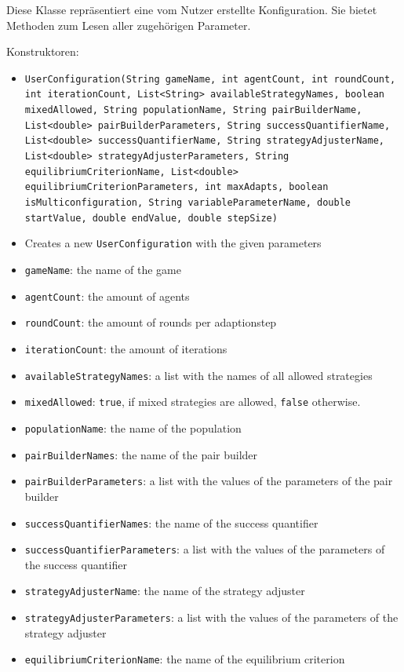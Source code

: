 \documentclass[parskip=full,11pt]{scrartcl}
\begin{document}
Diese Klasse repräsentiert eine vom Nutzer erstellte Konfiguration. Sie bietet Methoden zum Lesen aller zugehörigen Parameter.

Konstruktoren:
\begin{itemize}\itemsep -10pt
\item \texttt{UserConfiguration(String gameName, int agentCount, int roundCount, int iterationCount, List<String> availableStrategyNames, boolean mixedAllowed, String populationName, String pairBuilderName, List<double> pairBuilderParameters, String successQuantifierName, List<double> successQuantifierName, String strategyAdjusterName, List<double> strategyAdjusterParameters, String\\ equilibriumCriterionName, List<double> equilibriumCriterionParameters, int maxAdapts, boolean isMulticonfiguration, String variableParameterName, double startValue, double endValue, double stepSize)}
\item[] Creates a new \texttt{UserConfiguration} with the given parameters
\item[] \texttt{gameName}: the name of the game
\item[] \texttt{agentCount}: the amount of agents
\item[] \texttt{roundCount}: the amount of rounds per adaptionstep
\item[] \texttt{iterationCount}: the amount of iterations
\item[] \texttt{availableStrategyNames}: a list with the names of all allowed strategies
\item[] \texttt{mixedAllowed}: \texttt{true}, if mixed strategies are allowed, \texttt{false} otherwise.
\item[] \texttt{populationName}: the name of the population
\item[] \texttt{pairBuilderNames}: the name of the pair builder
\item[] \texttt{pairBuilderParameters}: a list with the values of the parameters of the pair builder
\item[] \texttt{successQuantifierNames}: the name of the success quantifier
\item[] \texttt{successQuantifierParameters}: a list with the values of the parameters of the success quantifier
\item[] \texttt{strategyAdjusterName}: the name of the strategy adjuster
\item[] \texttt{strategyAdjusterParameters}: a list with the values of the parameters of the strategy adjuster
\item[] \texttt{equilibriumCriterionName}: the name of the equilibrium criterion

\end{itemize}
\end{document}
